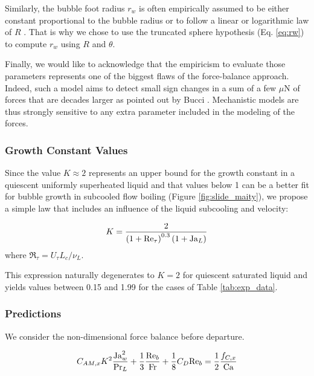 Similarly, the bubble foot radius $r_{w}$ is often empirically assumed to be either constant \cite{klausner_vapor_1993} proportional to the bubble radius \cite{sugrue_modified_2016, mazzocco_reassessed_2018} or to follow a linear or logarithmic law of $R$ \cite{zhou_experimental_2020, guan_bubble_2015}. That is why we chose to use the truncated sphere hypothesis (Eq. \ref{eq:rw}) to compute $r_{w}$ using $R$ and $\theta$.

Finally, we would like to acknowledge that the empiricism to evaluate those parameters represents one of the biggest flaws of the force-balance approach. Indeed, such a model aims to detect small sign changes in a sum of a few $\mu\mathrm{N}$ of forces that are decades larger as pointed out by Bucci \etal \cite{bucci_not-so-subtle_2021}. Mechanistic models are thus strongly sensitive to any extra parameter included in the modeling of the forces.

\subsubsection{Growth Constant Values}

Since the value $K\approx 2 $ represents an upper bound for the growth constant in a quiescent uniformly superheated liquid \cite{plesset_growth_1954} and that values below 1 can be a better fit for bubble growth in subcooled flow boiling (Figure \ref{fig:slide_maity}), we propose a simple law that includes an influence of the liquid subcooling and velocity:

\begin{equation}
K = \frac{2}{\left( 1+\mathrm{Re}_{\tau} \right)^{0.3}\left( 1+\mathrm{Ja}_{L} \right)}
\label{eq:Kgrowth}
\end{equation}
where $\Re_{\tau} = U_{\tau} L_{c} / \nu_{L}$.

This expression naturally degenerates to $K=2$ for quiescent saturated liquid and yields values between 0.15 and 1.99 for the cases of Table \ref{tab:exp_data}.


\subsubsection{Predictions}

We consider the non-dimensional force balance before departure.

\begin{equation}
C_{AM,x}K^{2} \frac{\mathrm{Ja}_{w}^{2}}{\mathrm{Pr}_{L}} + \frac{1}{3}\frac{\mathrm{Re}_{b}}{\mathrm{Fr}} + \frac{1}{8}C_{D}\mathrm{Re}_{b} = \frac{1}{2} \frac{f_{C,x}}{\mathrm{Ca}}
\end{equation}

